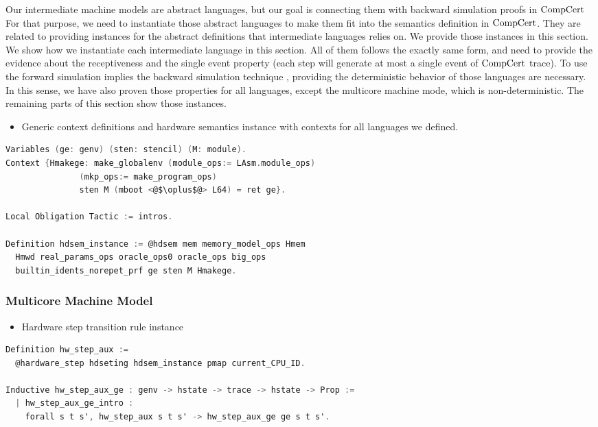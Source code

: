 Our intermediate machine models are abstract languages, but 
our goal is connecting them with backward simulation proofs in $\mathrm{CompCert}$~
For that purpose, 
we need to instantiate those abstract languages to make them fit into 
the semantics definition in $\mathrm{CompCert}$.
They are related to
providing instances 
for the abstract definitions that intermediate languages relies on. 
We provide those instances in this section. 
We show how we instantiate each intermediate language 
in this section. All of them follows the exactly same form, 
and need to provide the evidence about the receptiveness and the single event property (each step will generate at most a single event of $\mathrm{CompCert}$ trace). 
To use the forward simulation implies the backward simulation technique ,
providing the deterministic behavior of those languages 
are necessary. 
In this sense, 
we have also proven those properties 
for all languages, except the multicore machine mode, which is non-deterministic. 
The remaining parts of this section 
show those instances.

\begin{itemize}[leftmargin=*]
\item Generic context definitions and hardware semantics instance with contexts for all languages we defined.
\end{itemize}
\begin{lstlisting}[language=C]
Variables (ge: genv) (sten: stencil) (M: module).
Context {Hmakege: make_globalenv (module_ops:= LAsm.module_ops)
               (mkp_ops:= make_program_ops) 
               sten M (mboot <@$\oplus$@> L64) = ret ge}.        
    
Local Obligation Tactic := intros.
    
Definition hdsem_instance := @hdsem mem memory_model_ops Hmem 
  Hmwd real_params_ops oracle_ops0 oracle_ops big_ops 
  builtin_idents_norepet_prf ge sten M Hmakege.    
\end{lstlisting}

\subsubsection{Multicore Machine Model}

\begin{itemize}[leftmargin=*]
\item Hardware step transition rule instance
\end{itemize}
\begin{lstlisting}[language=C]
Definition hw_step_aux :=
  @hardware_step hdseting hdsem_instance pmap current_CPU_ID.

Inductive hw_step_aux_ge : genv -> hstate -> trace -> hstate -> Prop :=
  | hw_step_aux_ge_intro : 
    forall s t s', hw_step_aux s t s' -> hw_step_aux_ge ge s t s'.
\end{lstlisting}

